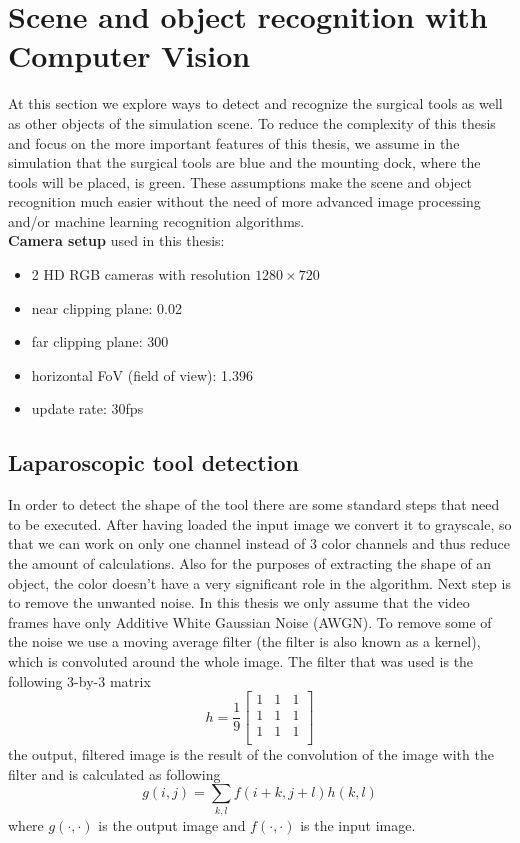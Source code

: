 \chapter{Scene and object recognition with Computer Vision}

At this section we explore ways to detect and recognize the surgical tools as well as other objects of the simulation scene. To reduce the complexity of 
this thesis and focus on the more important features of this thesis, we assume in the simulation that the surgical tools are blue and the mounting dock, 
where the tools will be placed, is green. These assumptions make the scene and object recognition much easier without the need of more advanced image 
processing and/or machine learning recognition algorithms.\\

\textbf{Camera setup} used in this thesis:
\begin{itemize}
\item 2 HD RGB cameras with resolution $1280 \times 720$
\item near clipping plane: 0.02
\item far clipping plane: 300 
\item horizontal FoV (field of view): 1.396
\item update rate: 30fps
\end{itemize}

\section{Laparoscopic tool detection}
\label{laparoscopic-tool-detection}

In order to detect the shape of the tool there are some standard steps that need to be executed. After having loaded the input image we convert it to grayscale, so that we can work on only one channel instead of
3 color channels and thus reduce the amount of calculations. Also for the purposes of extracting the shape of an object, the color doesn't have a very significant role in the algorithm. Next step is 
to remove the unwanted noise. In this thesis we only assume that the video frames have only Additive White Gaussian Noise (AWGN). To remove some of the
noise we use a moving average filter (the filter is also known as a kernel), which is convoluted around the whole image. The filter that was used is the following 3-by-3 matrix
\[
h = \frac{1}{9} \begin{bmatrix}
1 & 1 & 1 \\
1 & 1 & 1 \\
1 & 1 & 1 \\
\end{bmatrix}
\]
the output, filtered image is the result of the convolution of the image with the filter and is calculated as following
\begin{equation}
g(i,j) = \sum_{k,l} f(i+k,j+l)h(k,l)
\end{equation}
where $g(\cdot, \cdot)$ is the output image and $f(\cdot, \cdot)$ is the input image.

